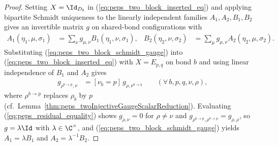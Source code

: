 \begin{proof}
    \leanok
    Setting $X=\Id_{D_b}$ in (\ref{eq:peps_two_block_inserted_eq}) and applying
    bipartite Schmidt uniqueness \cite[Section~3]{Molnar2018NormalPEPS} to the
    linearly independent families $A_1,A_2,B_1,B_2$ gives an invertible matrix
    $g$ on shared-bond configurations with
    \begin{align}
        A_1(\eta_1,\mu,\sigma_1)
                                                      & =
        \sum_\nu g_{\mu,\nu}B_1(\eta_1,\nu,\sigma_1), &
        B_2(\eta_2,\nu,\sigma_2)
                                                      & =
        \sum_\mu g_{\mu,\nu}A_2(\eta_2,\mu,\sigma_2).
        \label{eq:peps_two_block_schmidt_gauge}
    \end{align}
    Substituting (\ref{eq:peps_two_block_schmidt_gauge}) into
    (\ref{eq:peps_two_block_inserted_eq}) with $X=E_{p,q}$ on bond $b$ and using
    linear independence of $B_1$ and $A_2$ gives
    \begin{align}
        [\rho_b=q]\,g_{\rho^{b\to p},\nu}
         & =
        [\nu_b=p]\,g_{\rho,\nu^{b\to q}}
        \qquad (\forall\,b,p,q,\nu,\rho),
        \label{eq:peps_residual_equality}
    \end{align}
    where $\rho^{b\to p}$ replaces $\rho_b$ by $p$
    (cf.\ Lemma~\ref{thm:peps_twoInjectiveGaugeScalarReduction}). Evaluating
    (\ref{eq:peps_residual_equality}) shows $g_{\rho,\nu}=0$ for $\rho\neq\nu$
    and $g_{\rho^{b\to p},\rho^{b\to p}}=g_{\rho,\rho}$, so $g=\lambda\Id$ with
    $\lambda\in\C^\times$, and (\ref{eq:peps_two_block_schmidt_gauge}) yields
    $A_1=\lambda B_1$ and $A_2=\lambda^{-1}B_2$.
\end{proof}
